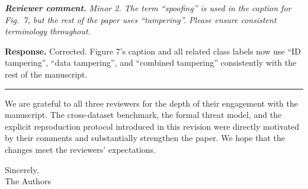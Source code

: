 \documentclass[11pt,a4paper]{article}
\newcommand{\rcomment}[1]{%
  \par\medskip
  \begingroup
  \itshape
  \textbf{Reviewer comment.}\,\,#1
  \endgroup
  \par
}
\newcommand{\rresponse}[1]{%
  \par
  \begingroup
  \color{NavyBlue}
  \textbf{Response.}\,\,#1
  \endgroup
  \par\medskip
}
\begin{document}
\rcomment{Minor 2. The term ``spoofing'' is used in the caption
for Fig.~7, but the rest of the paper uses ``tampering''. Please
ensure consistent terminology throughout.}
\rresponse{Corrected. Figure 7's caption and all related class
labels now use ``ID tampering'', ``data tampering'', and
``combined tampering'' consistently with the rest of the
manuscript.}

\hrule
\medskip

\noindent We are grateful to all three reviewers for the depth
of their engagement with the manuscript. The cross-dataset
benchmark, the formal threat model, and the explicit reproduction
protocol introduced in this revision were directly motivated by
their comments and substantially strengthen the paper. We hope
that the changes meet the reviewers' expectations.

\bigskip

\noindent Sincerely, \\
The Authors
\end{document}
